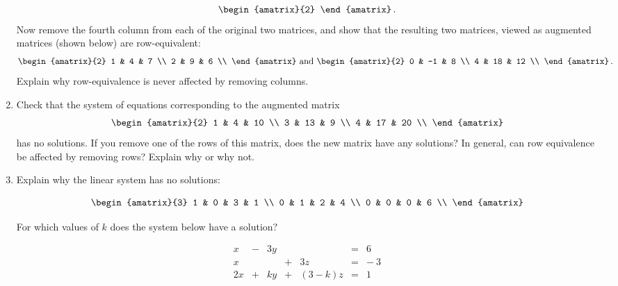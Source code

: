 \begin{enumerate}
\[\begin{amatrix}{2}
\end{amatrix}\, .
\]
Now remove the fourth column from each of the original two matrices, and show that the resulting two matrices, viewed as augmented matrices (shown below) are row-equivalent:
\[
\begin{amatrix}{2}
1 & 4 & 7 \\
2 & 9 & 6 \\
\end{amatrix}
\mbox{ and }
\begin{amatrix}{2}
0 & -1 & 8 \\
4 & 18 & 12 \\
\end{amatrix}\, .
\]
Explain why row-equivalence is never affected by removing columns.


\item Check that the system of equations corresponding to the augmented matrix
\[\begin{amatrix}{2}
1 & 4 & 10 \\
3 & 13 & 9 \\
4 & 17 & 20 \\
\end{amatrix}\]
has no solutions. If you remove one of the rows of this matrix, does the new matrix have any solutions? In general, can row equivalence be affected by removing rows? Explain why or why not.


\item \label{Ihavenoslons} 
Explain why the linear system has no solutions:

\[\begin{amatrix}{3}
1 & 0 & 3 & 1 \\
0 & 1 & 2 & 4 \\
0 & 0 & 0 & 6 \\
\end{amatrix}\]

For which values of $k$ does the system below have a solution?

    \begin{equation*}
      \begin{array}{rrrrrrr}
            x   &  -& 3y   & & &=  & 6  \\
            x   &  & &+& 3 z   &=  & -\ 3 \\
            2x  &  +& ky &  +&\!\! (3-k)z   &=  &1  
      \end{array}
    \end{equation*}


\end{enumerate}
